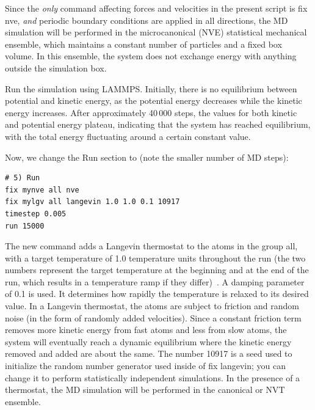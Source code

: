 \documentclass[9pt,tutorial]{livecoms}
\newcommand{\lmpcmd}[1]{\colorbox{listing}{\textcolor{command}{\small{#1}}}} %
\begin{document}
\begin{note}
  {\color{blue}Since the \emph{only} command affecting forces
    and velocities in the present script is \lmpcmd{fix nve}, \emph{and}
    periodic boundary conditions are applied in all directions,} the MD
  simulation will be performed in the microcanonical (NVE) {\color{blue}
    statistical mechanical} ensemble, which maintains a constant number
  of particles and a fixed box volume. In this ensemble, the system does
  not exchange energy with anything outside the simulation box.
\end{note}

Run the simulation using LAMMPS.  Initially, there is no equilibrium
between potential and kinetic energy, as the potential energy
decreases while the kinetic energy increases.  After approximately
40\,000 steps, the values for both kinetic and potential energy
plateau, indicating that the system has reached equilibrium, with
the total energy fluctuating around a certain constant value.

Now, we change the \lmpcmd{Run} section to (note the smaller number of
MD steps):
\begin{lstlisting}
# 5) Run
fix mynve all nve
fix mylgv all langevin 1.0 1.0 0.1 10917
timestep 0.005
run 15000
\end{lstlisting}
The new command adds a Langevin thermostat to the atoms in the group
\lmpcmd{all}, with a target temperature of 1.0 temperature units
throughout the run (the two numbers represent the target temperature at
the beginning and at the end of the run, which results in a temperature
ramp if they differ)~\cite{schneider1978molecular}.  A \lmpcmd{damping}
parameter of 0.1 is used.  It determines how rapidly the temperature is
relaxed to its desired value.  In a Langevin thermostat, the atoms are
subject to friction and random noise (in the form of randomly added
velocities).  Since a constant friction term removes more kinetic energy
from fast atoms and less from slow atoms, the system will eventually
reach a dynamic equilibrium where the kinetic energy removed and added
are about the same.  The number 10917 is a seed used to initialize the
random number generator used inside of \lmpcmd{fix langevin}; you can
change it to perform statistically independent simulations.  In the
presence of a thermostat, the MD simulation will be performed in the
canonical or NVT ensemble.
\end{document}
